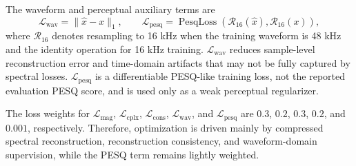 The waveform and perceptual auxiliary terms are
\begin{equation}
    \mathcal{L}_{\mathrm{wav}}
    =
    \|\hat{x}-x\|_{1},
    \qquad
    \mathcal{L}_{\mathrm{pesq}}
    =
    \operatorname{PesqLoss}
    \left(
    \mathcal{R}_{16}(\hat{x}),
    \mathcal{R}_{16}(x)
    \right),
\end{equation}
where \(\mathcal{R}_{16}\) denotes resampling to 16 kHz when the training waveform is 48 kHz and the identity operation for 16 kHz training. \(\mathcal{L}_{\mathrm{wav}}\) reduces sample-level reconstruction error and time-domain artifacts that may not be fully captured by spectral losses. \(\mathcal{L}_{\mathrm{pesq}}\) is a differentiable PESQ-like training loss, not the reported evaluation PESQ score, and is used only as a weak perceptual regularizer.

The loss weights for \(\mathcal{L}_{\mathrm{mag}}\), \(\mathcal{L}_{\mathrm{cplx}}\), \(\mathcal{L}_{\mathrm{cons}}\), \(\mathcal{L}_{\mathrm{wav}}\), and \(\mathcal{L}_{\mathrm{pesq}}\) are \(0.3\), \(0.2\), \(0.3\), \(0.2\), and \(0.001\), respectively. Therefore, optimization is driven mainly by compressed spectral reconstruction, reconstruction consistency, and waveform-domain supervision, while the PESQ term remains lightly weighted.
